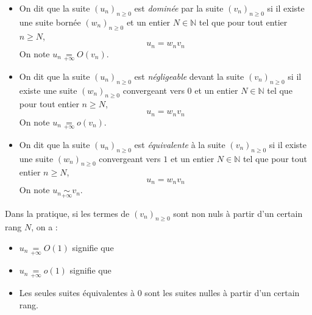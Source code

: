\documentclass[french,11pt,twoside]{VcCours}
\begin{document}
\begin{Definition}{}

\begin{itemize}
\item On dit que la suite $(u_n)_{n \geq 0}$ est \emph{dominée} par la suite $(v_n)_{n \geq 0}$ si il existe une suite bornée $(w_n)_{n \geq 0}$ et un entier $N \in \mathbb{N}$ tel que pour tout entier $n \geq N$,
$$ u_n = w_n v_n$$
On note $u_n  \underset{+ \infty}{=} O(v_n)$.
\item On dit que la suite $(u_n)_{n \geq 0}$ est \emph{négligeable} devant la suite $(v_n)_{n \geq 0}$ si il existe une suite  $(w_n)_{n \geq 0}$ convergeant vers $0$ et un entier $N \in \mathbb{N}$ tel que pour tout entier $n \geq N$,
$$ u_n = w_n v_n$$
On note $u_n \underset{ + \infty}{=} o(v_n)$.
\item On dit que la suite $(u_n)_{n \geq 0}$ est \emph{équivalente} à la suite $(v_n)_{n \geq 0}$ si il existe une suite  $(w_n)_{n \geq 0}$ convergeant vers $1$ et un entier $N \in \mathbb{N}$ tel que pour tout entier $n \geq N$,
$$ u_n = w_n v_n$$
On note $u_n  \underset{ + \infty}{\sim} v_n$.
\end{itemize}
\end{Definition}

\medskip

Dans la pratique, si les termes de $(v_n)_{n \geq 0}$ sont non nuls à partir d'un certain rang $N$, on a :
%
%

\newpage

\begin{Remarques}{}
\begin{itemize}
\item $u_n  \underset{+ \infty}{=} O(1)$ signifie que 
\item $u_n  \underset{+ \infty}{=} o(1)$ signifie que 
\item Les seules suites équivalentes à $0$ sont les suites nulles à partir d'un certain rang.
\end{itemize}
\end{Remarques}
\end{document}
